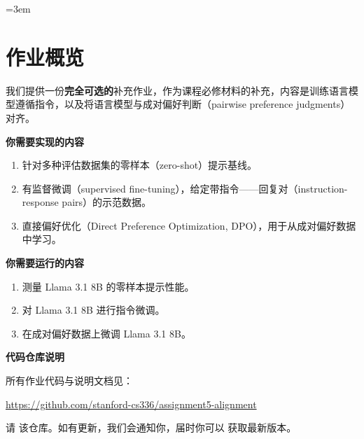 \emergencystretch=3em
\section{作业概览}

我们提供一份\textbf{完全可选的}补充作业，作为课程必修材料的补充，内容是训练语言模型遵循指令，以及将语言模型与成对偏好判断（pairwise preference judgments）对齐。

\textbf{你需要实现的内容}
\begin{enumerate}
  \item 针对多种评估数据集的零样本（zero-shot）提示基线。
  \item 有监督微调（supervised fine-tuning），给定带指令——回复对（instruction-response pairs）的示范数据。
  \item 直接偏好优化（Direct Preference Optimization, DPO），用于从成对偏好数据中学习。
\end{enumerate}

\textbf{你需要运行的内容}
\begin{enumerate}
  \item 测量 Llama 3.1 8B 的零样本提示性能。
  \item 对 Llama 3.1 8B 进行指令微调。
  \item 在成对偏好数据上微调 Llama 3.1 8B。
\end{enumerate}

\textbf{代码仓库说明}

所有作业代码与说明文档见：

\begin{center}
\url{https://github.com/stanford-cs336/assignment5-alignment}
\end{center}

请  该仓库。如有更新，我们会通知你，届时你可以  获取最新版本。

